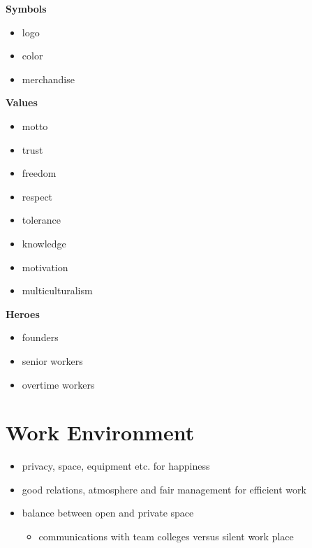 \documentclass[11pt,a4paper]{article}
\begin{document}
\textbf{Symbols}\\[-7.5mm]
\begin{itemize}
    \item logo\\[-7.5mm]
    \item color\\[-7.5mm]
    \item merchandise
\end{itemize}

\textbf{Values}\\[-7.5mm]
\begin{itemize}
    \item motto\\[-7.5mm]
    \item trust\\[-7.5mm]
    \item freedom\\[-7.5mm]
    \item respect\\[-7.5mm]
    \item tolerance\\[-7.5mm]
    \item knowledge\\[-7.5mm]
    \item motivation\\[-7.5mm]
    \item multiculturalism
\end{itemize}

\textbf{Heroes}\\[-7.5mm]
\begin{itemize}
    \item founders\\[-7.5mm]
    \item senior workers\\[-7.5mm]
    \item overtime workers
\end{itemize}

\section{Work Environment}

\begin{itemize}
    \item privacy, space, equipment etc. for happiness\\[-7.5mm]
    \item good relations, atmosphere and fair management for efficient work\\[-7.5mm]
    \item balance between open and private space\\[-7.5mm]
    \begin{itemize}
        \item communications with team colleges versus silent work place
    \end{itemize}
\end{itemize}
\end{document}

